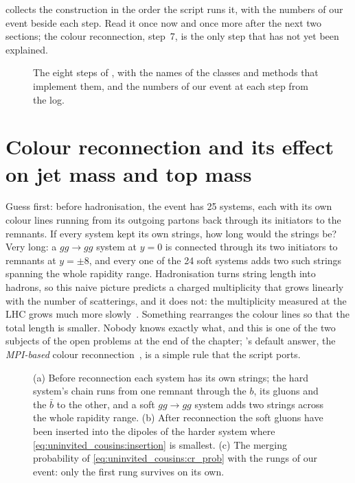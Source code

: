  collects the construction in the order the
script runs it, with the numbers of our event beside each step. Read it
once now and once more after the next two sections; the colour
reconnection, step~7, is the only step that has not yet been explained.

\begin{figure}[htbp]\centering
\resizebox{\textwidth}{!}{}
\caption[The MPI stage as a flow chart]{The eight steps of
, with the names of the classes
and methods that implement them, and the numbers of our event at each step
from the  log.}
\label{fig:uninvited_cousins:flow}
\end{figure}

\section{Colour reconnection and its effect on jet mass and top mass}
\label{sec:uninvited_cousins:colour_reconnection_and_its_effect_on_je}

Guess first: before hadronisation, the event has 25 systems, each with its
own colour lines running from its outgoing partons back through its
initiators to the remnants. If every system kept its own strings, how long
would the strings be? Very long: a $gg\to gg$ system at $y=0$ is connected
through its two initiators to remnants at $y=\pm8$, and every one of the
24 soft systems adds two such strings spanning the whole rapidity range.
Hadronisation turns string length into hadrons, so this naive picture
predicts a charged multiplicity that grows linearly with the number of
scatterings, and it does not: the multiplicity measured at the LHC grows
much more slowly~\cite{Sjostrand:2017cdm}. Something rearranges the colour
lines so that the total length is smaller. Nobody knows exactly what, and
this is one of the two subjects of the open problems at the end of the
chapter; \PYTHIA's default answer, the \emph{MPI-based} colour
reconnection~\cite{Sjostrand:2004pf,Sjostrand:2013cya}, is a simple rule
that the script ports.

\begin{figure}[htbp]\centering
\resizebox{\textwidth}{!}{}
\caption[Colour reconnection in the MPI-based model]{(a) Before
reconnection each system has its own strings; the hard system's chain runs
from one remnant through the $b$, its gluons and the $\bar b$ to the other,
and a soft $gg\to gg$ system adds two strings across the whole rapidity
range. (b) After reconnection the soft gluons have been inserted into the
dipoles of the harder system where
\cref{eq:uninvited_cousins:insertion} is smallest. (c) The merging
probability of \cref{eq:uninvited_cousins:cr_prob} with the rungs of our
event: only the first rung survives on its own.}
\label{fig:uninvited_cousins:cr_sketch}
\end{figure}

